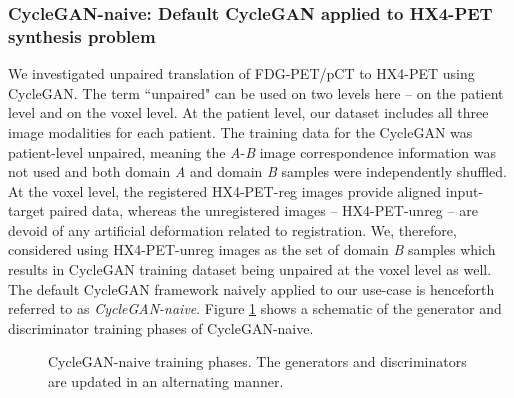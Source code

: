 \subsubsection{CycleGAN-naive: Default CycleGAN applied to HX4-PET synthesis problem}
We investigated unpaired translation of FDG-PET/pCT to HX4-PET using CycleGAN. The term ``unpaired" can be used on two levels here -- on the patient level and on the voxel level. At the patient level, our dataset includes all three image modalities for each patient. The training data for the CycleGAN was patient-level unpaired, meaning the \textit{A}-\textit{B} image correspondence information was not used and both domain \textit{A} and domain \textit{B} samples were independently shuffled. At the voxel level, the registered HX4-PET-reg images provide aligned input-target paired data, whereas the unregistered images -- HX4-PET-unreg -- are devoid of any artificial deformation related to registration. We, therefore, considered using HX4-PET-unreg images as the set of domain \textit{B} samples which results in CycleGAN training dataset being unpaired at the voxel level as well. The default CycleGAN framework naively applied to our use-case is henceforth referred to as \textit{CycleGAN-naive}. Figure \ref{fig:cyclegan_naive} shows a schematic of the generator and discriminator training phases of CycleGAN-naive. 

\begin{figure}[h!]
    \centering
    \caption{CycleGAN-naive training phases. The generators and discriminators are updated in an alternating manner.}
    \label{fig:cyclegan_naive}
\end{figure}{}

